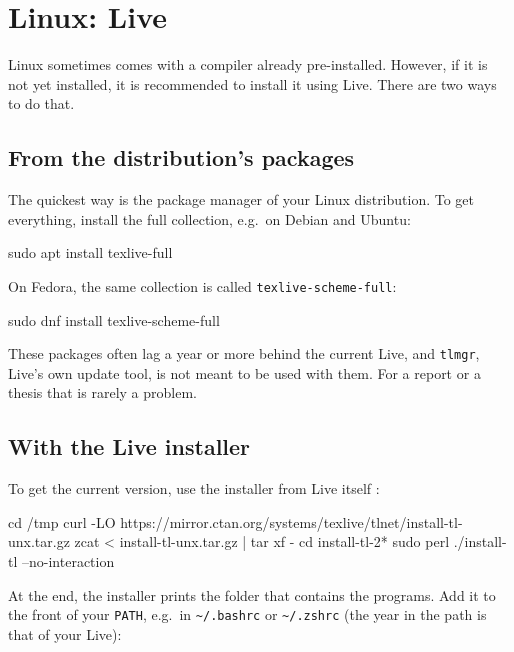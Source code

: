 \section{Linux:  Live}\label{sec:linux}

Linux sometimes comes with a  compiler already pre-installed.
However, if it is not yet installed, it is recommended to install it using  Live.
There are two ways to do that.

\subsection{From the distribution's packages}

The quickest way is the package manager of your Linux distribution.
To get everything, install the full collection, e.g.\ on Debian and Ubuntu:

\begin{codeblock}[style=shell]
sudo apt install texlive-full
\end{codeblock}

On Fedora, the same collection is called \texttt{texlive-scheme-full}:

\begin{codeblock}[style=shell]
sudo dnf install texlive-scheme-full
\end{codeblock}

These packages often lag a year or more behind the current  Live,
and \texttt{tlmgr},  Live's own update tool, is not meant to be used with them.
For a report or a thesis that is rarely a problem.

\subsection{With the  Live installer}

To get the current version, use the installer from  Live itself
\parencite{texlive-quickinstall}:

\begin{codeblock}[style=shell]
cd /tmp
curl -LO https://mirror.ctan.org/systems/texlive/tlnet/install-tl-unx.tar.gz
zcat < install-tl-unx.tar.gz | tar xf -
cd install-tl-2*
sudo perl ./install-tl --no-interaction
\end{codeblock}

At the end, the installer prints the folder that contains the programs.
Add it to the front of your \texttt{PATH},
e.g.\ in \texttt{\textasciitilde/.bashrc} or \texttt{\textasciitilde/.zshrc}
(the year in the path is that of your  Live):

